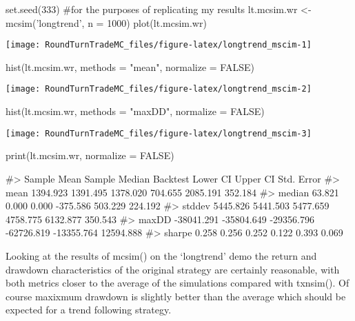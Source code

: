 \begin{Schunk}
\begin{Sinput}
set.seed(333) #for the purposes of replicating my results
lt.mcsim.wr <- mcsim('longtrend', n = 1000)
plot(lt.mcsim.wr)
\end{Sinput}


\begin{center}\texttt{[image: RoundTurnTradeMC\_files/figure-latex/longtrend\_mscim-1]} \end{center}

\begin{Sinput}
hist(lt.mcsim.wr, methods = "mean", normalize = FALSE)
\end{Sinput}


\begin{center}\texttt{[image: RoundTurnTradeMC\_files/figure-latex/longtrend\_mscim-2]} \end{center}

\begin{Sinput}
hist(lt.mcsim.wr, methods = "maxDD", normalize = FALSE)
\end{Sinput}


\begin{center}\texttt{[image: RoundTurnTradeMC\_files/figure-latex/longtrend\_mscim-3]} \end{center}

\begin{Sinput}
print(lt.mcsim.wr, normalize = FALSE)
\end{Sinput}
\begin{Soutput}
#>        Sample Mean Sample Median   Backtest   Lower CI   Upper CI Std. Error
#> mean      1394.923      1391.495   1378.020    704.655   2085.191    352.184
#> median      63.821         0.000      0.000   -375.586    503.229    224.192
#> stddev    5445.826      5441.503   5477.659   4758.775   6132.877    350.543
#> maxDD   -38041.291    -35804.649 -29356.796 -62726.819 -13355.764  12594.888
#> sharpe       0.258         0.256      0.252      0.122      0.393      0.069
\end{Soutput}
\end{Schunk}

Looking at the results of mcsim() on the `longtrend' demo the return and
drawdown characteristics of the original strategy are certainly
reasonable, with both metrics closer to the average of the simulations
compared with txnsim(). Of course maxixmum drawdown is slightly better
than the average which should be expected for a trend following
strategy.


